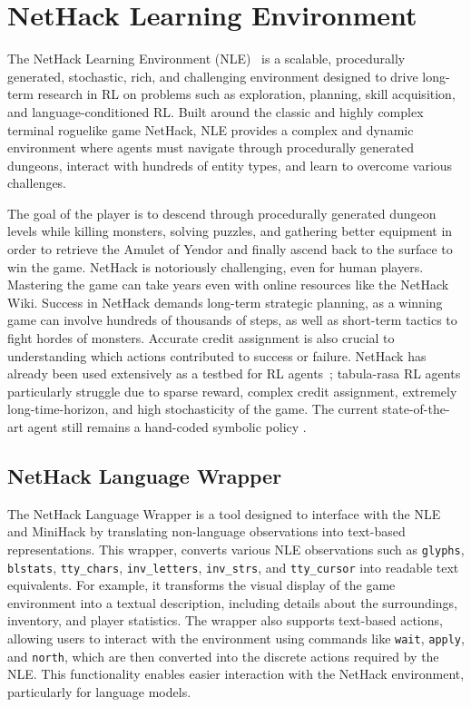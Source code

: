 \section{NetHack Learning Environment}
\label{nethack}

The NetHack Learning Environment (NLE)~\citep{kuttler2020nethack} is a scalable, procedurally generated, stochastic, rich, and challenging environment designed to drive long-term research in RL on problems such as exploration, planning, skill acquisition, and language-conditioned RL. Built around the classic and highly complex terminal roguelike game NetHack, NLE provides a complex and dynamic environment where agents must navigate through procedurally generated dungeons, interact with hundreds of entity types, and learn to overcome various challenges. 

The goal of the player is to descend through procedurally generated dungeon levels while killing monsters, solving puzzles, and gathering better equipment in order to retrieve the Amulet of Yendor and finally ascend back to the surface to win the game. 
NetHack is notoriously challenging, even for human players. Mastering the game can take years even with online resources like the NetHack Wiki. Success in NetHack demands long-term strategic planning, as a winning game can involve hundreds of thousands of steps, as well as short-term tactics to fight hordes of monsters. Accurate credit assignment is also crucial to understanding which actions contributed to success or failure. NetHack has already been used extensively as a testbed for RL agents~\citep{wolczyk2024fine, piterbarg2023diff, hambro2022dungeons}; tabula-rasa RL agents particularly struggle due to sparse reward, complex credit assignment, extremely long-time-horizon, and high stochasticity of the game. The current state-of-the-art agent still remains a hand-coded symbolic policy \citep{hambro2022insights}.

\label{nethack_language_wrapper}
\subsection{NetHack Language Wrapper}
The NetHack Language Wrapper \citep{goodger2023nethack} is a tool designed to interface with the NLE and MiniHack by translating non-language observations into text-based representations. This wrapper, converts various NLE observations such as \verb|glyphs|, \verb|blstats|, \verb|tty_chars|, \verb|inv_letters|, \verb|inv_strs|, and \verb|tty_cursor| into readable text equivalents. For example, it transforms the visual display of the game environment into a textual description, including details about the surroundings, inventory, and player statistics. The wrapper also supports text-based actions, allowing users to interact with the environment using commands like \verb|wait|, \verb|apply|, and \verb|north|, which are then converted into the discrete actions required by the NLE. This functionality enables easier interaction with the NetHack environment, particularly for language models.

